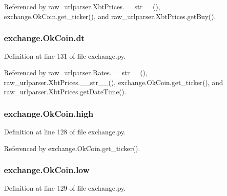 Referenced by raw\-\_\-urlparser.\-Xbt\-Prices.\-\_\-\-\_\-str\-\_\-\-\_\-(), exchange.\-Ok\-Coin.\-get\-\_\-ticker(), and raw\-\_\-urlparser.\-Xbt\-Prices.\-get\-Buy().

\hypertarget{classexchange_1_1_ok_coin_ade9d7cddcfa54f2b1ba5452854bfd48b}{
\subsubsection[{dt}]{\setlength{\rightskip}{0pt plus 5cm}exchange.\-Ok\-Coin.\-dt}}\label{classexchange_1_1_ok_coin_ade9d7cddcfa54f2b1ba5452854bfd48b}


Definition at line 131 of file exchange.\-py.



Referenced by raw\-\_\-urlparser.\-Rates.\-\_\-\-\_\-str\-\_\-\-\_\-(), raw\-\_\-urlparser.\-Xbt\-Prices.\-\_\-\-\_\-str\-\_\-\-\_\-(), exchange.\-Ok\-Coin.\-get\-\_\-ticker(), and raw\-\_\-urlparser.\-Xbt\-Prices.\-get\-Date\-Time().

\hypertarget{classexchange_1_1_ok_coin_af9d9dbcfc86404510e7f9a5704e8eecd}{
\subsubsection[{high}]{\setlength{\rightskip}{0pt plus 5cm}exchange.\-Ok\-Coin.\-high}}\label{classexchange_1_1_ok_coin_af9d9dbcfc86404510e7f9a5704e8eecd}


Definition at line 128 of file exchange.\-py.



Referenced by exchange.\-Ok\-Coin.\-get\-\_\-ticker().

\hypertarget{classexchange_1_1_ok_coin_a1afa53e0ad63830d0585288abea42094}{
\subsubsection[{low}]{\setlength{\rightskip}{0pt plus 5cm}exchange.\-Ok\-Coin.\-low}}\label{classexchange_1_1_ok_coin_a1afa53e0ad63830d0585288abea42094}


Definition at line 129 of file exchange.\-py.



